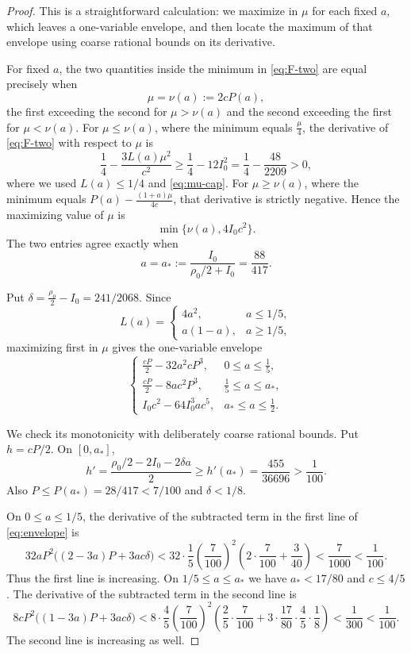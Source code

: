 \documentclass[11pt,reqno]{amsart}
\theoremstyle{plain}
\newcommand{\dens}{\rho}
\begin{document}
\begin{proof}
This is a straightforward calculation: we maximize in $\mu$ for each fixed $a$,
which leaves a one-variable envelope, and then locate the maximum of that
envelope using coarse rational bounds on its derivative.

For fixed $a$, the two quantities inside the minimum in \eqref{eq:F-two} are
equal precisely when
\[
 \mu=\nu(a):=2cP(a),
\]
the first exceeding the second for $\mu>\nu(a)$ and the second exceeding the
first for $\mu<\nu(a)$.  For $\mu\le\nu(a)$, where the minimum equals
$\tfrac\mu4$, the derivative of \eqref{eq:F-two} with respect to $\mu$ is
\[
 \frac14-\frac{3L(a)\mu^2}{c^2}
 \ge\frac14-12I_0^2
 =\frac14-\frac{48}{2209}>0,
\]
where we used $L(a)\le1/4$ and \eqref{eq:mu-cap}.  For $\mu\ge\nu(a)$, where
the minimum equals $P(a)-\tfrac{(1+a)\mu}{4c}$, that derivative is strictly
negative.  Hence the maximizing value of $\mu$ is
\[
 \min\{\nu(a),4I_0c^2\}.
\]
The two entries agree exactly when
\[
 a=a_*:=\frac{I_0}{\dens_0/2+I_0}=\frac{88}{417}.
\]

Put $\delta=\tfrac{\dens_0}2-I_0=241/2068$.  Since
\[
 L(a)=\begin{cases}4a^2,&a\le1/5,\\a(1-a),&a\ge1/5,
 \end{cases}
\]
maximizing first in $\mu$ gives the one-variable envelope
\begin{equation}\label{eq:envelope}
 \begin{cases}
 \displaystyle \frac{cP}{2}-32a^2cP^3,
   &0\le a\le\frac15,\\[5pt]
 \displaystyle \frac{cP}{2}-8ac^2P^3,
   &\frac15\le a\le a_*,\\[5pt]
 \displaystyle I_0c^2-64I_0^3ac^5,
   &a_*\le a\le\frac12.
 \end{cases}
\end{equation}

We check its monotonicity with deliberately coarse rational bounds.  Put
$h=cP/2$.  On $[0,a_*]$,
\[
 h'=\frac{\dens_0/2-2I_0-2\delta a}{2}
 \ge h'(a_*)=\frac{455}{36696}>\frac1{100}.
\]
Also $P\le P(a_*)=28/417<7/100$ and $\delta<1/8$.

On $0\le a\le1/5$, the derivative of the subtracted term in the first line
of \eqref{eq:envelope} is
\[
 32aP^2\bigl((2-3a)P+3ac\delta\bigr)
 <32\cdot\frac15\left(\frac7{100}\right)^2
 \left(2\cdot\frac7{100}+\frac3{40}\right)
 <\frac7{1000}<\frac1{100}.
\]
Thus the first line is increasing.  On $1/5\le a\le a_*$ we have
$a_*<17/80$ and $c\le4/5$.  The derivative of the subtracted term in the
second line is
\[
 8cP^2\bigl((1-3a)P+3ac\delta\bigr)
 <8\cdot\frac45\left(\frac7{100}\right)^2
 \left(\frac25\cdot\frac7{100}
 +3\cdot\frac{17}{80}\cdot\frac45\cdot\frac18\right)
 <\frac1{300}<\frac1{100}.
\]
The second line is increasing as well.


\end{proof}
\end{document}
